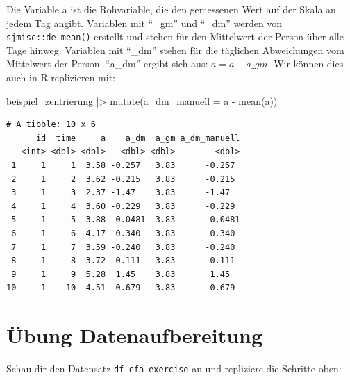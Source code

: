 \documentclass[
  letterpaper,
  DIV=11,
  numbers=noendperiod]{scrreprt}
\newenvironment{Shaded}{\begin{snugshade}}{\end{snugshade}}
\newcommand{\AttributeTok}[1]{\textcolor[rgb]{0.40,0.45,0.13}{#1}}
\newcommand{\FunctionTok}[1]{\textcolor[rgb]{0.28,0.35,0.67}{#1}}
\newcommand{\NormalTok}[1]{\textcolor[rgb]{0.00,0.23,0.31}{#1}}
\newcommand{\SpecialCharTok}[1]{\textcolor[rgb]{0.37,0.37,0.37}{#1}}
\begin{document}
\begin{tcolorbox}[enhanced jigsaw, bottomtitle=1mm, coltitle=black, titlerule=0mm, colbacktitle=quarto-callout-tip-color!10!white, colback=white, left=2mm, title=\textcolor{quarto-callout-tip-color}{\faLightbulb}\hspace{0.5em}{Lösung}, opacitybacktitle=0.6, arc=.35mm, leftrule=.75mm, toptitle=1mm, rightrule=.15mm, opacityback=0, bottomrule=.15mm, toprule=.15mm, colframe=quarto-callout-tip-color-frame, breakable]

Die Variable a ist die Rohvariable, die den gemessenen Wert auf der
Skala an jedem Tag angibt. Variablen mit ``\_gm'' und ``\_dm'' werden
von \texttt{sjmisc::de\_mean()} erstellt und stehen für den Mittelwert
der Person über alle Tage hinweg. Variablen mit ``\_dm'' stehen für die
täglichen Abweichungen vom Mittelwert der Person. ``a\_dm'' ergibt sich
aus: \(a = a - a\_gm\). Wir können dies auch in R replizieren mit:

\begin{Shaded}
\begin{Highlighting}[]
\NormalTok{beispiel\_zentrierung }\SpecialCharTok{|\textgreater{}} 
  \FunctionTok{mutate}\NormalTok{(}\AttributeTok{a\_dm\_manuell =}\NormalTok{ a }\SpecialCharTok{{-}} \FunctionTok{mean}\NormalTok{(a))}
\end{Highlighting}
\end{Shaded}

\begin{verbatim}
# A tibble: 10 x 6
      id  time     a    a_dm  a_gm a_dm_manuell
   <int> <dbl> <dbl>   <dbl> <dbl>        <dbl>
 1     1     1  3.58 -0.257   3.83      -0.257 
 2     1     2  3.62 -0.215   3.83      -0.215 
 3     1     3  2.37 -1.47    3.83      -1.47  
 4     1     4  3.60 -0.229   3.83      -0.229 
 5     1     5  3.88  0.0481  3.83       0.0481
 6     1     6  4.17  0.340   3.83       0.340 
 7     1     7  3.59 -0.240   3.83      -0.240 
 8     1     8  3.72 -0.111   3.83      -0.111 
 9     1     9  5.28  1.45    3.83       1.45  
10     1    10  4.51  0.679   3.83       0.679 
\end{verbatim}

\end{tcolorbox}

\section{Übung Datenaufbereitung}\label{uxfcbung-datenaufbereitung}

Schau dir den Datensatz \texttt{df\_cfa\_exercise} an und repliziere die
Schritte oben:
\end{document}
